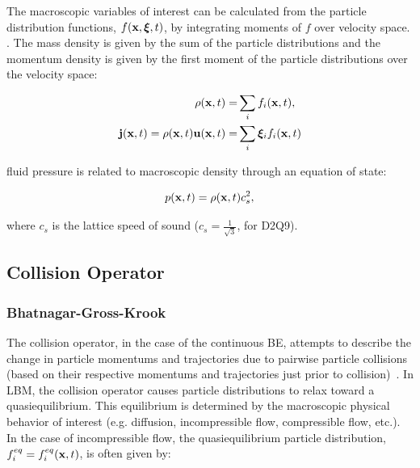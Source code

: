 The macroscopic variables of interest can be calculated from the particle distribution functions, $f(\mathbf{x}, \boldsymbol{\xi}, t)$, by integrating moments of $f$ over velocity space.
\DIFdelbegin {}\DIFdelend \DIFaddbegin {}\DIFaddend .
The mass density is given by the sum of the particle distributions and the momentum density is given by the first moment of the particle distributions over the velocity space:

\begin{align}
\label{eq:rho} \rho(\mathbf{x}, t) =& \sum_{i} f_i(\mathbf{x}, t), \\
\label{eq:mom} \mathbf{j}(\mathbf{x}, t) = \rho(\mathbf{x}, t) \mathbf{u}(\mathbf{x}, t) =& \sum_{i} \boldsymbol{\xi}_i f_i(\mathbf{x}, t)
\end{align}

\noindent \DIFdelbegin {}\DIFdelend \DIFaddbegin {}\DIFaddend fluid pressure is related to macroscopic density through an equation of state:

\begin{equation}
\label{eq:pres} p(\mathbf{x}, t) = \rho(\mathbf{x}, t) c_s^2,
\end{equation}

\noindent where $c_s$ is the lattice speed of sound ($c_s = \frac{1}{\sqrt{3}}$, for D2Q9).

\subsection{Collision Operator} \label{sec:colop}

\subsubsection{Bhatnagar-Gross-Krook} \label{sec:bgk}

The collision operator, in the case of the continuous BE, attempts to describe the change in particle momentums and trajectories due to pairwise particle collisions (based on their respective momentums and trajectories just prior to collision)~\cite{Cer90}.
In LBM, the collision operator causes particle distributions to relax toward a quasiequilibrium. 
This equilibrium is determined by the macroscopic physical behavior of interest (e.g. diffusion, incompressible flow, compressible flow, etc.).
In the case of incompressible flow, the quasiequilibrium particle distribution, $f_i^{eq} = f_i^{eq}(\mathbf{x}, t)$, is often given by:

